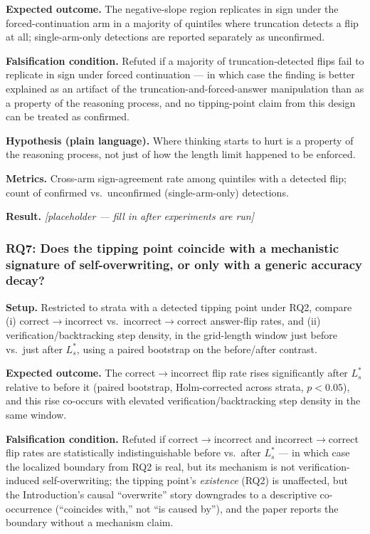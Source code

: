 \documentclass[11pt]{article}
\newcommand{\ph}{\textit{[placeholder --- fill in after experiments are run]}}
\begin{document}
\textbf{Expected outcome.} The negative-slope region replicates in sign under the forced-continuation arm in a majority of quintiles where truncation detects a flip at all; single-arm-only detections are reported separately as unconfirmed.

\textbf{Falsification condition.} Refuted if a majority of truncation-detected flips fail to replicate in sign under forced continuation --- in which case the finding is better explained as an artifact of the truncation-and-forced-answer manipulation than as a property of the reasoning process, and no tipping-point claim from this design can be treated as confirmed.

\textbf{Hypothesis (plain language).} Where thinking starts to hurt is a property of the reasoning process, not just of how the length limit happened to be enforced.

\textbf{Metrics.} Cross-arm sign-agreement rate among quintiles with a detected flip; count of confirmed vs.\ unconfirmed (single-arm-only) detections.

\textbf{Result.} \ph

\subsubsection{RQ7: Does the tipping point coincide with a mechanistic signature of self-overwriting, or only with a generic accuracy decay?}
\textbf{Setup.} Restricted to strata with a detected tipping point under RQ2, compare (i) correct$\to$incorrect vs.\ incorrect$\to$correct answer-flip rates, and (ii) verification/backtracking step density, in the grid-length window just before vs.\ just after $L^*_s$, using a paired bootstrap on the before/after contrast.

\textbf{Expected outcome.} The correct$\to$incorrect flip rate rises significantly after $L^*_s$ relative to before it (paired bootstrap, Holm-corrected across strata, $p<0.05$), and this rise co-occurs with elevated verification/backtracking step density in the same window.

\textbf{Falsification condition.} Refuted if correct$\to$incorrect and incorrect$\to$correct flip rates are statistically indistinguishable before vs.\ after $L^*_s$ --- in which case the localized boundary from RQ2 is real, but its mechanism is not verification-induced self-overwriting; the tipping point's \emph{existence} (RQ2) is unaffected, but the Introduction's causal ``overwrite'' story downgrades to a descriptive co-occurrence (``coincides with,'' not ``is caused by''), and the paper reports the boundary without a mechanism claim.
\end{document}
